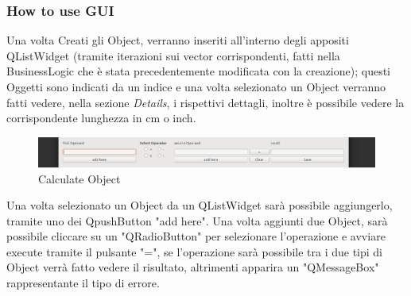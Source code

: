\documentclass[10pt]{beamer}
\begin{document}

\begin{frame} %
\frametitle{How to use GUI}
Una volta Creati gli Object, verranno inseriti all'interno degli appositi QListWidget (tramite iterazioni sui vector corrispondenti, fatti nella BusinessLogic che è stata precedentemente modificata con la creazione); questi Oggetti sono indicati da un indice e una volta selezionato un Object verranno fatti vedere, nella sezione \textit{Details}, i rispettivi dettagli, inoltre è possibile vedere la corrispondente lunghezza in cm o inch.

   \FloatBarrier
   \begin{figure}[ht]
   \centering
   \includegraphics[scale=0.10]{Calcolo.png}
   \caption{Calculate Object}
\end{figure}

Una volta selezionato un Object da un QListWidget sarà possibile aggiungerlo, tramite uno dei QpushButton "add here". Una volta aggiunti due Object, sarà possibile cliccare su un "QRadioButton" per selezionare l'operazione e avviare execute tramite il pulsante "=", se l'operazione sarà possibile tra i due tipi di Object verrà fatto vedere il risultato, altrimenti apparira un "QMessageBox" rappresentante il tipo di errore.



\end{frame}

\end{document}
